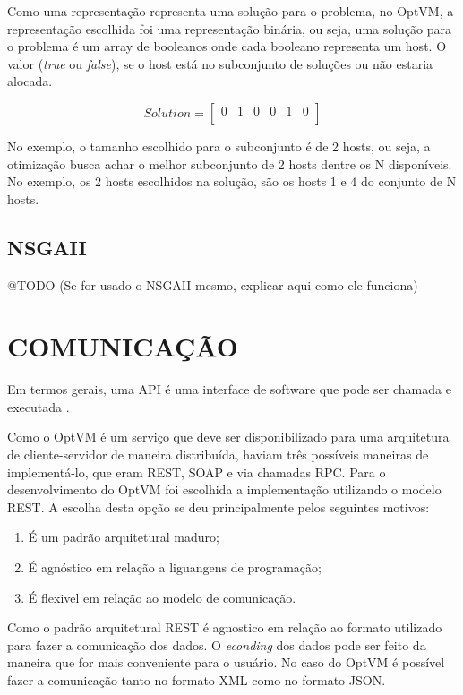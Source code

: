 Como uma representação representa uma solução para o problema, no OptVM, a 
representação escolhida foi uma representação binária, ou seja, uma solução
para o problema é um array de booleanos onde cada booleano representa um host.
O valor (\textit{true} ou \textit{false}), se o host está no subconjunto de soluções 
ou não estaria alocada.

\[
  Solution=
  \left[{\begin{array}{cccccc}
    0 & 1 & 0 & 0 & 1 & 0 \\
  \end{array}}\right
  ]
\]

No exemplo, o tamanho escolhido para o subconjunto é de 2 hosts, ou seja, 
a otimização busca achar o melhor subconjunto de 2 hosts dentre os N disponíveis. 
No exemplo, os 2 hosts escolhidos na solução, são os hosts 1 e 4 do conjunto de N hosts.

\subsection{NSGAII}

@TODO (Se for usado o NSGAII mesmo, explicar aqui como ele funciona)

\section{COMUNICAÇÃO}
Em termos gerais, uma API é uma interface de software que pode ser chamada e executada \cite{eizinger}. 

Como o OptVM é um serviço que deve ser disponibilizado para uma arquitetura de 
cliente-servidor de maneira distribuída, haviam três possíveis maneiras de implementá-lo, 
que eram REST, SOAP e via chamadas RPC. 
Para o desenvolvimento do OptVM foi escolhida a implementação utilizando o modelo REST. 
A escolha desta opção se deu principalmente pelos seguintes motivos:

\begin{enumerate}
\item É um padrão arquitetural maduro;
\item É agnóstico em relação a liguangens de programação;
\item É flexivel em relação ao modelo de comunicação.
\end{enumerate}

Como o padrão arquitetural REST é agnostico em relação ao formato utilizado para fazer a comunicação dos dados. O \textit{econding} 
dos dados pode ser feito da maneira que for mais conveniente para o usuário. No caso do OptVM é possível fazer a comunicação
tanto no formato XML como no formato JSON.

